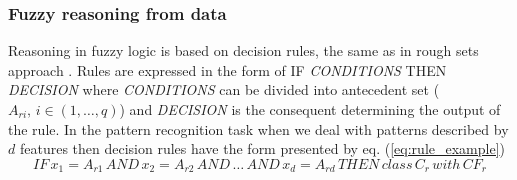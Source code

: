 \subsubsection{Fuzzy reasoning from data }
Reasoning in fuzzy logic is based on decision rules, the same as in rough sets
approach \cite{bib11}. 
Rules are expressed in the form of IF \textit{CONDITIONS} THEN \textit{DECISION}
where \textit{CONDITIONS} can be divided into antecedent set ($A_{ri}, \, i \in
(1, \ldots, q)$) and \textit{DECISION} is the consequent determining the
output of the rule. In the pattern recognition task when we deal with patterns
described by $d$ features then decision rules have the form presented by eq. (\ref{eq:rule_example})
\begin{equation}
    IF\, x_1=A_{r1}\, AND\, x_2=A_{r2}\, AND\, \ldots\, AND\, x_d=A_{rd}\, THEN\,
class\, C_r\, with \, CF_r
    \label{eq:rule_example}
\end{equation}

